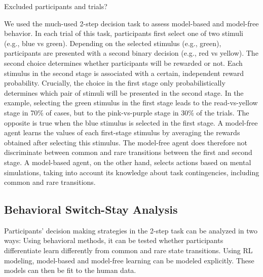 \documentclass[11pt]{article} %
\begin{document}
Excluded participants and trials?

We used the much-used 2-step decision task to assess model-based and model-free behavior. In each trial of this task, participants first select one of two stimuli (e.g., blue vs green). Depending on the selected stimulus (e.g., green), participants are presented with a second binary decision (e.g., red vs yellow). The second choice determines whether participants will be rewarded or not. Each stimulus in the second stage is associated with a certain, independent reward probability. Crucially, the choice in the first stage only probabilistically determines which pair of stimuli will be presented in the second stage. In the example, selecting the green stimulus in the first stage leads to the read-vs-yellow stage in 70\% of cases, but to the pink-vs-purple stage in 30\% of the trials. The opposite is true when the blue stimulus is selected in the first stage. A model-free agent learns the values of each first-stage stimulus by averaging the rewards obtained after selecting this stimulus. The model-free agent does therefore not discriminate between common and rare transitions between the first and second stage. A model-based agent, on the other hand, selects actions based on mental simulations, taking into account its knowledge about task contingencies, including common and rare transitions. 

\subsection{Behavioral Switch-Stay Analysis}
Participants' decision making strategies in the 2-step task can be analyzed in two ways: Using behavioral methods, it can be tested whether participants differentiate learn differently from common and rare state transitions. Using RL modeling, model-based and model-free learning can be modeled explicitly. These models can then be fit to the human data.
\end{document}
